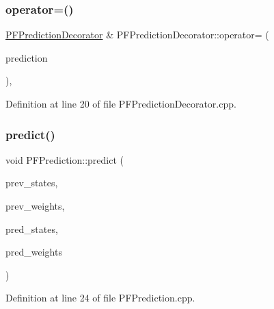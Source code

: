 \subsubsection{\texorpdfstring{operator=()}{operator=()}}
{\footnotesize\ttfamily \mbox{\hyperlink{classbfl_1_1PFPredictionDecorator}{P\+F\+Prediction\+Decorator}} \& P\+F\+Prediction\+Decorator\+::operator= (\begin{DoxyParamCaption}\item[{\mbox{\hyperlink{classbfl_1_1PFPredictionDecorator}{P\+F\+Prediction\+Decorator}} \&\&}]{prediction }\end{DoxyParamCaption})\hspace{0.3cm}{\ttfamily [protected]}, {\ttfamily [noexcept]}}



Definition at line 20 of file P\+F\+Prediction\+Decorator.\+cpp.

\mbox{\label{classbfl_1_1PFPrediction_a54986f12509d3d997232c4e926420c90}} 
\subsubsection{\texorpdfstring{predict()}{predict()}}
{\footnotesize\ttfamily void P\+F\+Prediction\+::predict (\begin{DoxyParamCaption}\item[{const Eigen\+::\+Ref$<$ const Eigen\+::\+Matrix\+Xf $>$ \&}]{prev\+\_\+states,  }\item[{const Eigen\+::\+Ref$<$ const Eigen\+::\+Vector\+Xf $>$ \&}]{prev\+\_\+weights,  }\item[{Eigen\+::\+Ref$<$ Eigen\+::\+Matrix\+Xf $>$}]{pred\+\_\+states,  }\item[{Eigen\+::\+Ref$<$ Eigen\+::\+Vector\+Xf $>$}]{pred\+\_\+weights }\end{DoxyParamCaption})\hspace{0.3cm}{\ttfamily [inherited]}}



Definition at line 24 of file P\+F\+Prediction.\+cpp.

\mbox{\label{classbfl_1_1PFPredictionDecorator_af005f96b493e9ba72058613bbc7a8e43}} 

